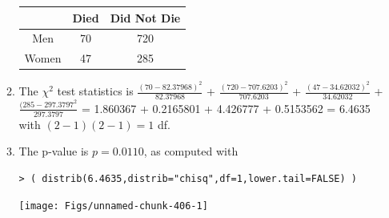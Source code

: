 \documentclass[10pt,openany]{book}\usepackage[]{graphicx}\usepackage[]{color}
\makeatletter
\newenvironment{kframe}{%
 \def\at@end@of@kframe{}%
 \ifinner\ifhmode%
  \def\at@end@of@kframe{\end{minipage}}%
  \begin{minipage}{\columnwidth}%
 \fi\fi%
 \def\FrameCommand##1{\hskip\@totalleftmargin \hskip-\fboxsep
 \colorbox{shadecolor}{##1}\hskip-\fboxsep
     \hskip-\linewidth \hskip-\@totalleftmargin \hskip\columnwidth}%
 \MakeFramed {\advance\hsize-\width
   \@totalleftmargin\z@ \linewidth\hsize
   \@setminipage}}%
 {\par\unskip\endMakeFramed%
 \at@end@of@kframe}
\newenvironment{knitrout}{}{} %
\makeatother
\begin{document}
\begin{itemize}
\begin{enumerate}
\begin{center}
\begin{tabular}{|c|c|c|}
             & Died & Did Not Die \\
            \hline
            Men & 70 & 720 \\
            \hline
            Women & 47 & 285 \\
            \hline\hline
          \end{tabular}
        \end{center}
      \item The $\chi^{2}$ test statistics is $\frac{(70-82.37968)^{2}}{82.37968}$ + $\frac{(720-707.6203)^{2}}{707.6203}$ + $\frac{(47-34.62032)^{2}}{34.62032}$ + $\frac{(285-297.3797^{2}}{297.3797}$ = 1.860367 + 0.2165801 + 4.426777 + 0.5153562 = 6.4635 with $(2-1)(2-1)=1$ df.
      \item The p-value is $p=0.0110$, as computed with
\begin{knitrout}
\color{fgcolor}\begin{kframe}
\begin{verbatim}
> ( distrib(6.4635,distrib="chisq",df=1,lower.tail=FALSE) )
\end{verbatim}


{\ttfamily\noindent\bfseries\color{errorcolor}{Error in plot.window(...): need finite 'ylim' values}}\end{kframe}

{\centering \texttt{[image: Figs/unnamed-chunk-406-1]} 

}




\end{knitrout}
\end{enumerate}
\end{itemize}
\end{document}
